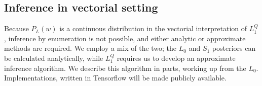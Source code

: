 \documentclass[9pt,twocolumn,twoside,lineno]{pnas-new}
\newcommand{\Listener}{L}
\newcommand{\QLONE}{\Listener_{{1}}^{{Q}}}
\begin{document}
{%


\subsection*{Inference in vectorial setting} \label{technicaloverview}


	Because $P_L(w)$ is a continuous distribution in the vectorial interpretation of $\QLONE$, inference by enumeration is not possible, and either analytic or approximate methods are required. We employ a mix of the two; the $L_0$ and $S_1$ posteriors can be calculated analytically, while $\QLONE$ requires us to develop an approximate inference algorithm.
	We describe this algorithm in parts, working up from the $L_0$. Implementations, written in Tensorflow will be made publicly available.



}
\end{document}
